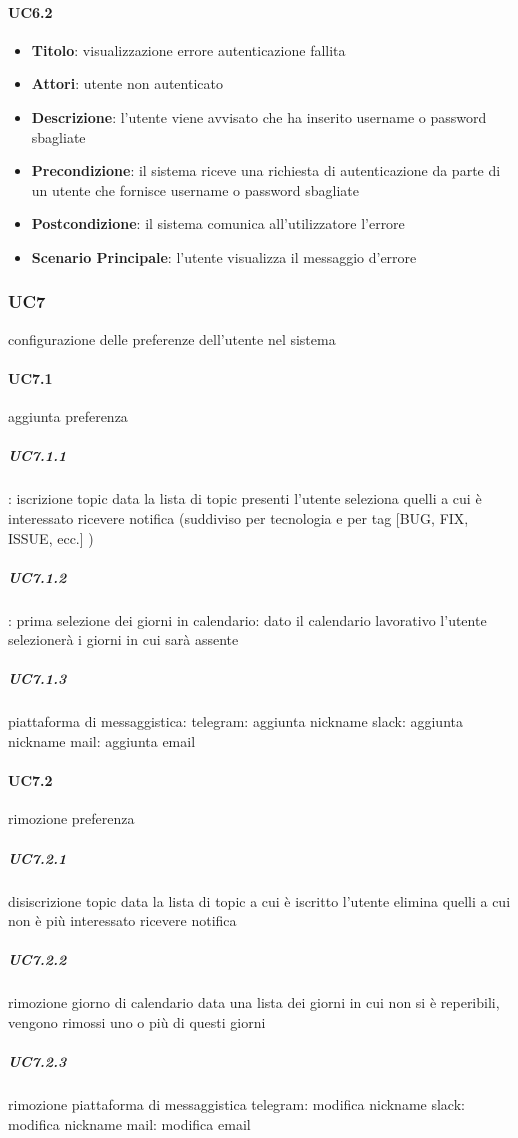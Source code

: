 	\paragraph{UC6.2}
		\begin{itemize}
			\item \textbf{Titolo}: visualizzazione errore autenticazione fallita
			\item \textbf{Attori}: utente non autenticato
			\item \textbf{Descrizione}: l'utente viene avvisato che ha inserito username o password sbagliate
			\item \textbf{Precondizione}: il sistema riceve una richiesta di autenticazione da parte di un utente che
			fornisce username o password sbagliate
			\item \textbf{Postcondizione}: il sistema comunica all'utilizzatore l'errore
			\item \textbf{Scenario Principale}: l'utente visualizza il messaggio d'errore
		\end{itemize}

\subsubsection{UC7}
configurazione delle preferenze dell'utente nel sistema

	\paragraph{UC7.1}
	aggiunta preferenza
		\subparagraph{UC7.1.1}:
		iscrizione topic
			data la lista di topic presenti l'utente seleziona quelli a cui è interessato ricevere notifica (suddiviso per tecnologia e per tag [BUG, FIX, ISSUE, ecc.] )
		\subparagraph{UC7.1.2}:
		prima selezione dei giorni in calendario:
			dato il calendario lavorativo l'utente selezionerà i giorni in cui sarà assente
		\subparagraph{UC7.1.3}
		piattaforma di messaggistica:
			telegram: aggiunta nickname
			slack: aggiunta nickname
			mail: aggiunta email

	\paragraph{UC7.2}
	rimozione preferenza
		\subparagraph{UC7.2.1}
		disiscrizione topic %
			data la lista di topic a cui è iscritto l'utente elimina quelli a cui non è più interessato ricevere notifica
		\subparagraph{UC7.2.2}
		rimozione giorno di calendario
			data una lista dei giorni in cui non si è reperibili, vengono rimossi uno o più di questi giorni
		\subparagraph{UC7.2.3}
		rimozione piattaforma di messaggistica %
			telegram: modifica nickname
			slack: modifica nickname
			mail: modifica email
			
